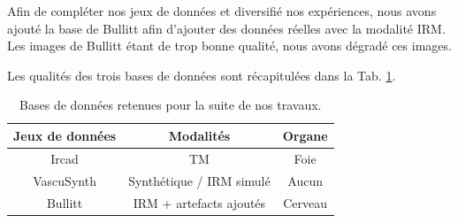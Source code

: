 Afin de compléter nos jeux de données et diversifié nos expériences, nous avons ajouté la base de Bullitt afin d'ajouter des données réelles avec la modalité IRM. Les images de Bullitt étant de trop bonne qualité, nous avons dégradé ces images.

Les qualités des trois bases de données sont récapitulées dans la Tab. \ref{tab:db_for_exp}.

\begin{table}
    \centering
    \begin{tabular}{ c|c|c }
        \hline
        Jeux de données & Modalités & Organe \\
        \hline
        Ircad           & TM & Foie \\
        VascuSynth      & Synthétique / IRM simulé & Aucun \\
        Bullitt         & IRM + artefacts ajoutés & Cerveau \\
        \hline
    \end{tabular}
    \caption{Bases de données retenues pour la suite de nos travaux.}
    \label{tab:db_for_exp}
  \end{table}


